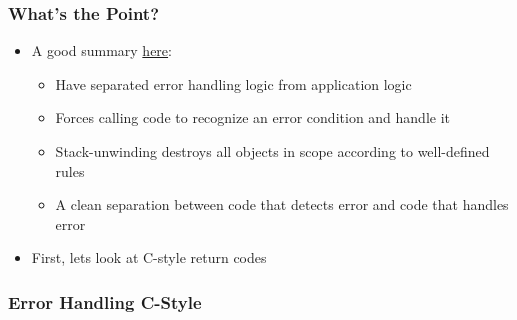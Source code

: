 \begin{Shaded}
\begin{Highlighting}[]
 \NormalTok{; \}}

\NormalTok{\{}
\NormalTok{  \{}
    \NormalTok{;}
\NormalTok{    \{}
       \NormalTok{);}
\NormalTok{    \}}
\NormalTok{  \}}
  \NormalTok{ (}
\NormalTok{  \{}
\NormalTok{  \}}
\NormalTok{\}}

\end{Highlighting}
\end{Shaded}

\hypertarget{whats-the-point}{%
\subsubsection{What's the Point?}\label{whats-the-point}}

\begin{itemize}
\tightlist
\item
  A good summary
  \href{https://msdn.microsoft.com/en-us/library/hh279678.aspx}{here}:

  \begin{itemize}
  \tightlist
  \item
    Have separated error handling logic from application logic
  \item
    Forces calling code to recognize an error condition and handle it
  \item
    Stack-unwinding destroys all objects in scope according to
    well-defined rules
  \item
    A clean separation between code that detects error and code that
    handles error
  \end{itemize}
\item
  First, lets look at C-style return codes
\end{itemize}

\hypertarget{error-handling-c-style}{%
\subsubsection{Error Handling C-Style}\label{error-handling-c-style}}

